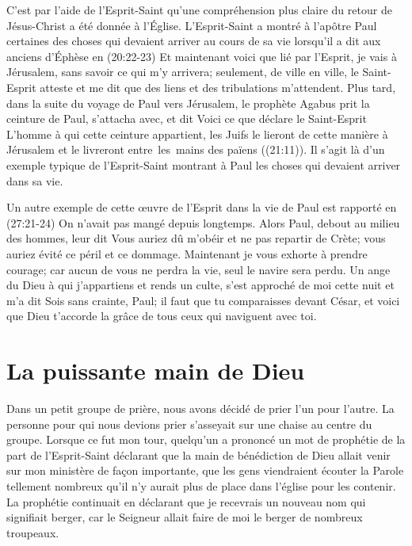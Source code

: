 C'est par l'aide de l'Esprit-Saint qu'une compréhension plus claire
 du retour de Jésus-Christ a été donnée à l'Église.
 L'Esprit-Saint a montré à l'apôtre Paul certaines des choses
 qui devaient arriver au cours de sa vie lorsqu'il a dit aux anciens d'Éphèse
 en (20:22-23)\frcolon{}
 \Og Et maintenant voici que lié par l'Esprit, je vais à Jérusalem,
 sans savoir ce qui m'y arrivera; seulement, de ville en ville,
 le Saint-Esprit atteste et me dit que des liens
 et des tribulations m'attendent. \Fg{}
 Plus tard, dans la suite du voyage de Paul vers Jérusalem,
 le prophète Agabus prit la ceinture de Paul, s'attacha avec, et dit\frcolon{}
 \Og Voici ce que déclare le Saint-Esprit\frcolon{}
 L'homme à qui cette ceinture appartient, les Juifs le lieront
 de cette manière à Jérusalem et le livreront
 entre~les~mains des païens \Fg{} ((21:11)).
 Il s'agit là d'un exemple typique de l'Esprit-Saint montrant à Paul
 les choses qui devaient arriver dans sa vie.

Un autre exemple de cette œuvre de l'Esprit dans la vie de Paul
 est rapporté en (27:21-24)\frcolon{}
 \Og On n'avait pas mangé depuis longtemps.
 Alors Paul, debout au milieu des hommes, leur dit\frcolon{}
 Vous auriez dû m'obéir et ne pas repartir de Crète;
 vous auriez évité ce péril et ce dommage.
 Maintenant je vous exhorte à prendre courage;
 car aucun de vous ne perdra la vie, seul le navire sera perdu.
 Un ange du Dieu à qui j'appartiens et rends un culte,
 s'est approché de moi cette nuit et m'a dit\frcolon{}
 Sois sans crainte, Paul; il faut que tu comparaisses devant César,
 et voici que Dieu t'accorde la grâce de tous ceux qui naviguent avec toi. \Fg{}


\section{La puissante main de Dieu}

Dans un petit groupe de prière, nous avons décidé de prier
 l'un pour l'autre.
 La personne pour qui nous devions prier s'asseyait sur une chaise
 au centre du groupe. Lorsque ce fut mon tour,
 quelqu'un a prononcé un mot de prophétie de la part de l'Esprit-Saint
 déclarant que la main de bénédiction de Dieu allait venir
 sur mon ministère de façon importante, que les gens viendraient écouter
 la Parole tellement nombreux qu'il n'y aurait plus de place dans l'église
 pour les contenir.
 La prophétie continuait en déclarant que je recevrais un nouveau nom
 qui signifiait berger, car le Seigneur allait faire de moi le berger
 de nombreux troupeaux.

